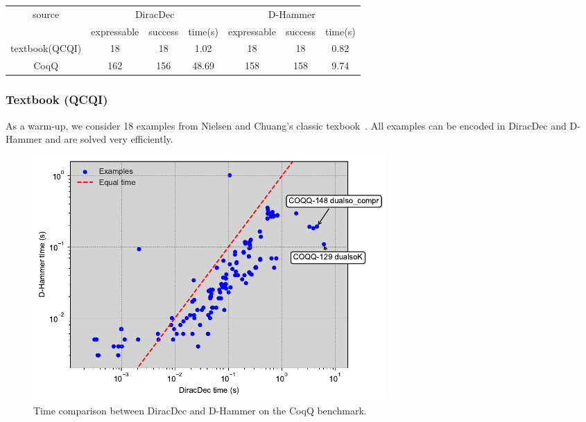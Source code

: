 \begin{center}
    \begin{tabular}{c|c c c|c c c}
        \hline
        \multirow{2}{*}{source} & \multicolumn{3}{c|}{DiracDec} & \multicolumn{3}{c}{D-Hammer} \\
        \cline{2-7}
                                 & expressable & success & time(s)           & expressable & success & time(s)                 \\
        \hline
        textbook(QCQI)          & 18          & 18        &    1.02        &    18      & 18          &   0.82      \\
        CoqQ                    & 162          & 156       &    48.69       &   158     &  158   &     9.74     \\
        \hline
    \end{tabular}        
\end{center}


\subsubsection{Textbook (QCQI)}
As a warm-up, we consider 18 examples from Nielsen and Chuang's
classic texbook~\cite{nielsen2010quantum}. All examples can be encoded
in DiracDec and D-Hammer and are solved very efficiently.

\begin{figure}
    \centering
    \includegraphics[width=0.65\textwidth]{fig/coqq.pdf}
    \caption{Time comparison between DiracDec and D-Hammer on the CoqQ benchmark.}
    \label{fig: CoqQ plot}
    \vspace{-0.4cm}
\end{figure}

